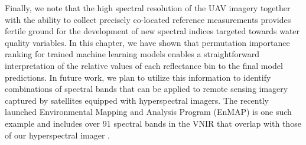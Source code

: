 Finally, we note that the high spectral resolution of the UAV imagery together with the ability to collect precisely co-located reference measurements provides fertile ground for the development of new spectral indices targeted towards water quality variables. In this chapter, we have shown that permutation importance ranking for trained machine learning models enables a straightforward interpretation of the relative values of each reflectance bin to the final model predictions. In future work, we plan to utilize this information to identify combinations of spectral bands that can be applied to remote sensing imagery captured by satellites equipped with hyperspectral imagers. The recently launched Environmental Mapping and Analysis Program (EnMAP) is one such example and includes over 91 spectral bands in the VNIR that overlap with those of our hyperspectral imager \cite{EnMAP-orig}. 


